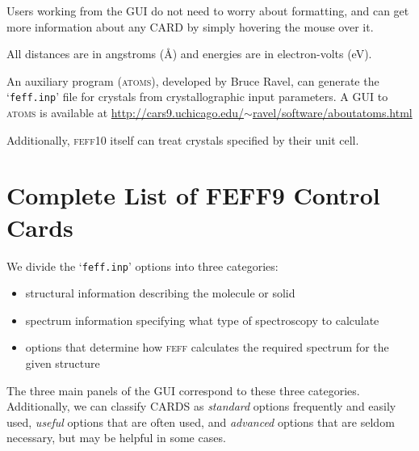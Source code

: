 \documentclass[11pt,oneside]{report} %
\renewcommand{\htmladdnormallink}[2]{\href{#2}{#1}}
\newcommand{\program}[1]{\textsc{#1}}
\newcommand{\feff}{\program{feff}}
\newcommand{\vnum}{10}
\newcommand{\feffcur}{\feff\vnum}
\newcommand{\file}[1]{`\texttt{#1}'}
\newcommand{\atoms}{\program{atoms}}
\begin{document}
Users working from the GUI do not need to worry about formatting, and can get more information about any CARD by simply hovering the mouse over it.

All distances are in angstroms ({\AA}) and energies are in electron-volts (eV). 

An auxiliary program ({\atoms}), developed
by Bruce Ravel, can generate the \file{feff.inp} file for crystals from crystallographic 
input parameters. A GUI to {\atoms} is
available at \htmladdnormallink
{http://cars9.uchicago.edu/$\sim$ravel/software/aboutatoms.html}
{http://cars9.uchicago.edu/~ravel/software/aboutatoms.html}

Additionally, {\feffcur} itself can treat crystals specified by their unit cell.



\section{Complete List of FEFF9 Control Cards}
\label{sec:Complete-list-FEFF9}


We divide the \file{feff.inp} options into three categories: 
\begin{itemize}
\item structural information describing the molecule or solid
\item spectrum information specifying what type of spectroscopy to calculate
\item options that determine how {\feff} calculates the required spectrum for the given structure
\end{itemize}

The three main panels of the GUI correspond to these three categories.  Additionally, we can
classify CARDS as \textsl{standard} options frequently and easily used, \textsl{useful}
options that are often used, and \textsl{advanced} options that are
seldom necessary, but may be helpful in some cases.
\end{document}
